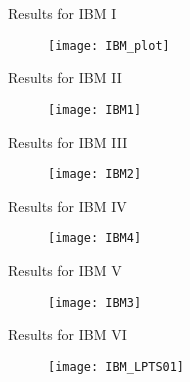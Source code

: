 \documentclass[9pt,xcolor=x11names,compress]{beamer}
\begin{document}
\begin{frame}{Results for IBM I}
	\begin{figure}
		\centering
		\texttt{[image: IBM\_plot]}
	\end{figure}
\end{frame}

\begin{frame}{Results for IBM II}
	\begin{figure}
		\centering
		\texttt{[image: IBM1]}
	\end{figure}
\end{frame}

\begin{frame}{Results for IBM III}
	\begin{figure}
		\centering
		\texttt{[image: IBM2]}
	\end{figure}
\end{frame}

\begin{frame}{Results for IBM IV}
	\begin{figure}
		\centering
		\texttt{[image: IBM4]}
	\end{figure}
\end{frame}


\begin{frame}{Results for IBM V}
	\begin{figure}
		\centering
		\texttt{[image: IBM3]}
	\end{figure}
\end{frame}

\begin{frame}{Results for IBM VI}
	\begin{figure}
		\centering
		\texttt{[image: IBM\_LPTS01]}
	\end{figure}
\end{frame}
\end{document}

